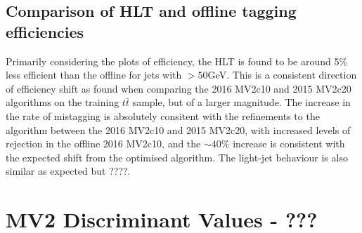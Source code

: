 	\subsection{Comparison of HLT and offline tagging efficiencies}

		Primarily considering the \pt plots of efficiency, the HLT \btag is found to be around 5\% less efficient than the offline \btag for jets with \pt$>50$GeV. This is a consistent direction of efficiency shift as found when comparing the 2016 MV2c10 and 2015 MV2c20 algorithms on the training $t\bar{t}$ sample, but of a larger magnitude. The increase in the rate of \cjet mistagging is absolutely consitent with the refinements to the algorithm between the 2016 MV2c10 and 2015 MV2c20, with increased levels of \cjet rejection in the offline 2016 MV2c10, and the $\sim40$\% increase is consistent with the expected shift from the optimised algorithm. \cite{btagOptimisation} The light-jet behaviour is also similar as expected but ????. 


	\section{MV2 Discriminant Values - ???} 




\endinput

